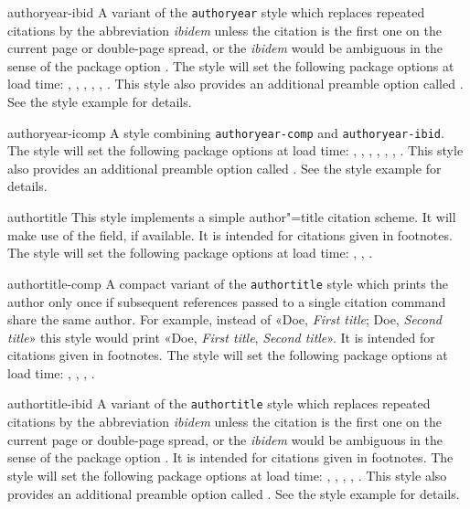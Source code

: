 \begin{marglist}
\item[authoryear-ibid]
A variant of the \texttt{authoryear} style which replaces repeated citations by the abbreviation \emph{ibidem} unless the citation is the first one on the current page or double-page spread, or the \emph{ibidem} would be ambiguous in the sense of the package option . The style will set the following package options at load time: , , , , , . This style also provides an additional preamble option called . See the style example for details.

\item[authoryear-icomp]
A style combining \texttt{authoryear-comp} and \texttt{authoryear-ibid}. The style will set the following package options at load time: , , , , , , . This style also provides an additional preamble option called . See the style example for details.

\item[authortitle]
This style implements a simple author"=title citation scheme. It will make use of the  field, if available. It is intended for citations given in footnotes. The style will set the following package options at load time: , , .

\item[authortitle-comp]
A compact variant of the \texttt{authortitle} style which prints the author only once if subsequent references passed to a single citation command share the same author. For example, instead of «Doe, \emph{First title}; Doe, \emph{Second title}» this style would print «Doe, \emph{First title}, \emph{Second title}». It is intended for citations given in footnotes. The style will set the following package options at load time: , , , .

\item[authortitle-ibid]
A variant of the \texttt{authortitle} style which replaces repeated citations by the abbreviation \emph{ibidem} unless the citation is the first one on the current page or double-page spread, or the \emph{ibidem} would be ambiguous in the sense of the package option . It is intended for citations given in footnotes. The style will set the following package options at load time: , , , , . This style also provides an additional preamble option called . See the style example for details.


\end{marglist}
